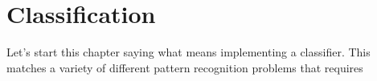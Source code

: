 \chapter{Classification}
Let's start this chapter saying what means implementing a classifier.
This matches a variety of different pattern recognition problems that requires 